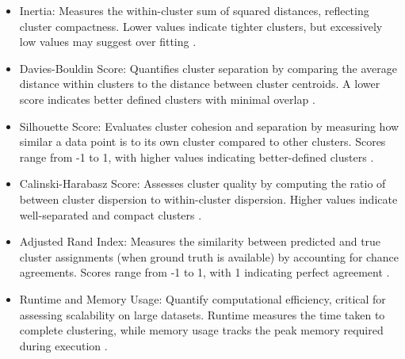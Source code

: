 \documentclass[twoside,11pt]{article}
\renewcommand{\cite}{\citep}
\begin{document}
\begin{itemize}[nosep]
    \item Inertia: Measures the within-cluster sum of squared distances, reflecting cluster compactness. Lower values indicate tighter clusters, but excessively low values may suggest over fitting \cite{rousseeuw1987,rykov2024}.
    \item Davies-Bouldin Score: Quantifies cluster separation by comparing the average distance within clusters to the distance between cluster centroids. A lower score indicates better defined clusters with minimal overlap \cite{davies1979,ros2023}.
    \item Silhouette Score: Evaluates cluster cohesion and separation by measuring how similar a data point is to its own cluster compared to other clusters. Scores range from -1 to 1, with higher values indicating better-defined clusters \cite{rousseeuw1987,shahapure2020}.
    \item Calinski-Harabasz Score: Assesses cluster quality by computing the ratio of between cluster dispersion to within-cluster dispersion. Higher values indicate well-separated and compact clusters \cite{calinski1974,lima2020}.
    \item Adjusted Rand Index: Measures the similarity between predicted and true cluster assignments (when ground truth is available) by accounting for chance agreements. Scores range from -1 to 1, with 1 indicating perfect agreement \cite{hubert1985,warrens2022}.
    \item Runtime and Memory Usage: Quantify computational efficiency, critical for assessing scalability on large datasets. Runtime measures the time taken to complete clustering, while memory usage tracks the peak memory required during execution \cite{pedregosa2011}.
\end{itemize}
\end{document}
